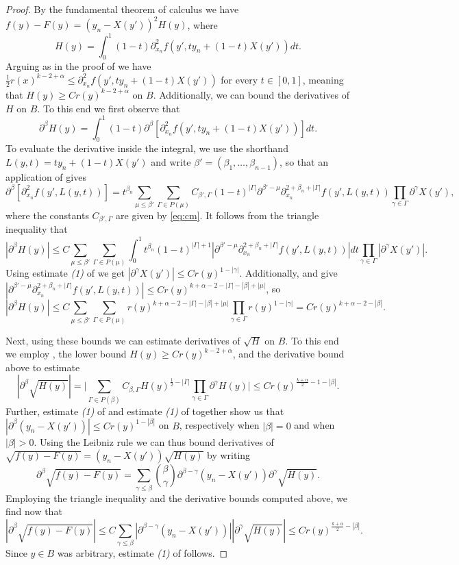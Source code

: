 \documentclass[oneside,hidelinks,indentfirst,10pt]{book}
\begin{document}
\begin{proof}
By the fundamental theorem of calculus we have \(f(y)-F(y)=(y_n-X(y'))^2H(y)\), where
\[
    H(y)=\int_0^1 (1-t)\partial^2_{x_n}f(y',ty_n+(1-t)X(y'))dt.
\]
Arguing as in the proof of  we have \(\frac{1}{2}r(x)^{k-2+\alpha}\leq \partial^2_{x_n}f(y',ty_n+(1-t)X(y'))\) for every \(t\in[0,1]\), meaning that \(H(y)\geq Cr(y)^{k-2+\alpha}\) on \(B\). Additionally, we can bound the derivatives of \(H\) on \(B\). To this end we first observe that
\[
    \partial^\beta H(y)=\int_0^1 (1-t)\partial^\beta[\partial^2_{x_n}f(y',ty_n+(1-t)X(y'))]dt.
\]
To evaluate the derivative inside the integral, we use the shorthand \(L(y,t)=ty_n+(1-t)X(y')\) and write \(\beta'=(\beta_1,\dots,\beta_{n-1})\), so that an application of  gives
\[
    \partial^\beta[\partial^2_{x_n}f(y',L(y,t))]=t^{\beta_n}\sum_{\mu\leq\beta'}\sum_{\Gamma\in P(\mu)}C_{\beta',\Gamma}(1-t)^{|\Gamma|}\partial^{\beta'-\mu}\partial_{x_n}^{2+\beta_n+|\Gamma|}f(y',L(y,t))\prod_{\gamma\in\Gamma}\partial^\gamma X(y'),
\]
where the constants \(C_{\beta',\Gamma}\) are given by \eqref{eq:cm}. It follows from the triangle inequality that
\[
    |\partial^\beta H(y)|\leq  C\sum_{\mu\leq\beta'}\sum_{\Gamma\in P(\mu)}\int_0^1t^{\beta_n}(1-t)^{|\Gamma|+1}|\partial^{\beta'-\mu}\partial_{x_n}^{2+\beta_n+|\Gamma|}f(y',L(y,t))|dt\prod_{\gamma\in\Gamma}|\partial^\gamma X(y')|.
\]
Using estimate \textit{(1)} of  we get \(|\partial^\gamma X(y')|\leq Cr(y)^{1-|\gamma|}\). Additionally,  and  give \(|\partial^{\beta'-\mu}\partial_{x_n}^{2+\beta_n+|\Gamma|}f(y',L(y,t))|\leq Cr(y)^{k+\alpha-2-|\Gamma|-|\beta|+|\mu|}\), so
\[
    |\partial^\beta H(y)|\leq  C\sum_{\mu\leq\beta'}\sum_{\Gamma\in P(\mu)}r(y)^{k+\alpha-2-|\Gamma|-|\beta|+|\mu|}\prod_{\gamma\in\Gamma}r(y)^{1-|\gamma|}=Cr(y)^{k+\alpha-2-|\beta|}.
\]


Next, using these bounds we can estimate derivatives of \(\sqrt{H}\) on \(B\). To this end we employ , the lower bound \(H(y)\geq Cr(y)^{k-2+\alpha}\), and the derivative bound above to estimate
\[
    |\partial^\beta \sqrt{H(y)}| =\bigg|\sum_{\Gamma\in P(\beta)}C_{\beta,\Gamma}H(y)^{\frac{1}{2}-|\Gamma|}\prod_{\gamma\in\Gamma}\partial^\gamma H(y)\bigg|\leq Cr(y)^{\frac{k+\alpha}{2}-1-|\beta|}.
\]
Further, estimate \textit{(1)} of  and estimate \textit{(1)} of  together show us that \(|\partial^\beta(y_n-X(y'))|\leq Cr(y)^{1-|\beta|}\) on \(B\), respectively when \(|\beta|=0\) and when \(|\beta|>0\). Using the Leibniz rule we can thus bound derivatives of \(\sqrt{f(y)-F(y)}=(y_n-X(y'))\sqrt{H(y)}\) by writing
\[
    \partial^\beta\sqrt{f(y)-F(y)}=\sum_{\gamma\leq\beta}\binom{\beta}{\gamma}\partial^{\beta-\gamma}(y_n-X(y'))\partial^\gamma\sqrt{H(y)}.
\]
Employing the triangle inequality and the derivative bounds computed above, we find now that
\[
    |\partial^\beta\sqrt{f(y)-F(y)}|\leq C\sum_{\gamma\leq\beta}|\partial^{\beta-\gamma}(y_n-X(y'))||\partial^\gamma\sqrt{H(y)}|\leq Cr(y)^{\frac{k+\alpha}{2}-|\beta|}.
\]
Since \(y\in B\) was arbitrary, estimate \textit{(1)} of  follows.



\end{proof}
\end{document}
